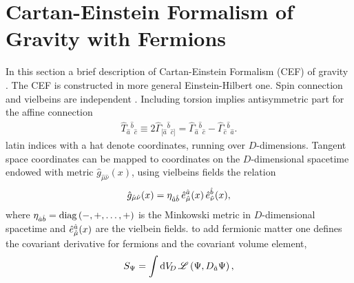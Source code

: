 \section{\label{sec:CEF}Cartan-Einstein Formalism of Gravity with Fermions}

In this section a brief description of Cartan-Einstein Formalism (CEF) of gravity  . The CEF is constructed in more general   Einstein-Hilbert one. Spin connection and vielbeins are independent  . Including torsion  implies   antisymmetric part for the affine connection 
\begin{align}
  \hat{T}_{\hat{a}}{}^{\hat{b}}{}_{\hat{c}} \equiv 2\hat{\Gamma}_{[\hat{a}}{}^{\hat{b}}{}_{\hat{c}]} = \hat{\Gamma}_{\hat{a}}{}^{\hat{b}}{}_{\hat{c}} - \hat{\Gamma}_{\hat{c}}{}^{\hat{b}}{}_{\hat{a}}.
\end{align}
  latin indices with a hat denote   coordinates, running over $D$-dimensions.  Tangent space coordinates can be mapped to coordinates on the  $D$-dimensional spacetime endowed with   metric $\hat{g}_{\hat{\mu}\hat{\nu}}(x)$, using vielbeins fields   the relation
\begin{equation}
  \label{metricrelation}
  \hat{g}_{\hat{\mu}\hat{\nu}}(x) = {\eta}_{\hat{a}\hat{b}}\,\hat{e}^{\hat{a}}_{\hat{\mu}}(x)\,\hat{e}^{\hat{b}}_{\hat{\nu}}(x),
\end{equation}
where ${\eta}_{\hat{a}\hat{b}} = \operatorname{diag}{\left(-,+,\ldots,+\right)}$ is the Minkowski metric in $D$-dimensional spacetime and $\hat{e}^{\hat{a}}_{\hat{\mu}}(x)$ are the vielbein fields.   to add fermionic matter 
one defines the covariant derivative for fermions and the covariant volume element,
\begin{equation}
  S_\Psi = \int \dv[D]%
  \,\Lag\left(\Psi,D_{\hat{a}}\Psi\right),
\end{equation}
